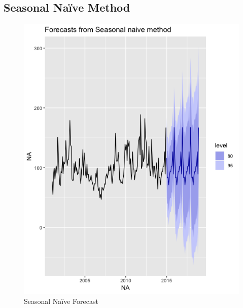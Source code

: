 \documentclass[12pt]{article}
\begin{document}
\subsection{Seasonal Naïve Method}
\begin{figure}[!tbp]
  \centering
  \begin{minipage}[b]{0.49\textwidth}
    \includegraphics[width=\textwidth]{Pre_sn.png}
    \caption{Seasonal Naïve Forecast}
  \end{minipage}
  \hfill
  \begin{minipage}[b]{0.49\textwidth}

\end{minipage}
\end{figure}
\end{document}
